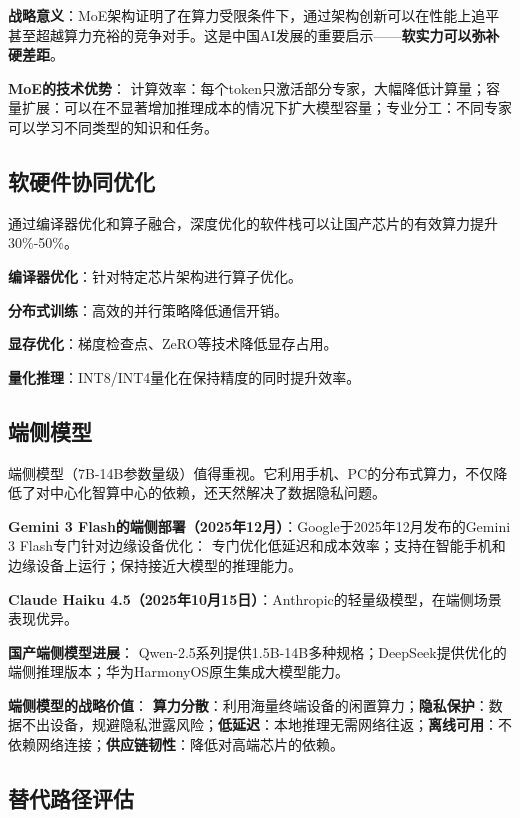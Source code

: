 \textbf{战略意义}：MoE架构证明了在算力受限条件下，通过架构创新可以在性能上追平甚至超越算力充裕的竞争对手。这是中国AI发展的重要启示——\textbf{软实力可以弥补硬差距}。

\textbf{MoE的技术优势}：
计算效率：每个token只激活部分专家，大幅降低计算量；容量扩展：可以在不显著增加推理成本的情况下扩大模型容量；专业分工：不同专家可以学习不同类型的知识和任务。

\subsection{软硬件协同优化}

通过编译器优化和算子融合，深度优化的软件栈可以让国产芯片的有效算力提升30\%-50\%。

\textbf{编译器优化}：针对特定芯片架构进行算子优化。

\textbf{分布式训练}：高效的并行策略降低通信开销。

\textbf{显存优化}：梯度检查点、ZeRO等技术降低显存占用。

\textbf{量化推理}：INT8/INT4量化在保持精度的同时提升效率。

\subsection{端侧模型}

端侧模型（7B-14B参数量级）值得重视。它利用手机、PC的分布式算力，不仅降低了对中心化智算中心的依赖，还天然解决了数据隐私问题。

\textbf{Gemini 3 Flash的端侧部署（2025年12月）}：Google于2025年12月发布的Gemini 3 Flash专门针对边缘设备优化：
专门优化低延迟和成本效率；支持在智能手机和边缘设备上运行；保持接近大模型的推理能力。

\textbf{Claude Haiku 4.5（2025年10月15日）}：Anthropic的轻量级模型，在端侧场景表现优异。

\textbf{国产端侧模型进展}：
Qwen-2.5系列提供1.5B-14B多种规格；DeepSeek提供优化的端侧推理版本；华为HarmonyOS原生集成大模型能力。

\textbf{端侧模型的战略价值}：
\textbf{算力分散}：利用海量终端设备的闲置算力；\textbf{隐私保护}：数据不出设备，规避隐私泄露风险；\textbf{低延迟}：本地推理无需网络往返；\textbf{离线可用}：不依赖网络连接；\textbf{供应链韧性}：降低对高端芯片的依赖。

\subsection{替代路径评估}

